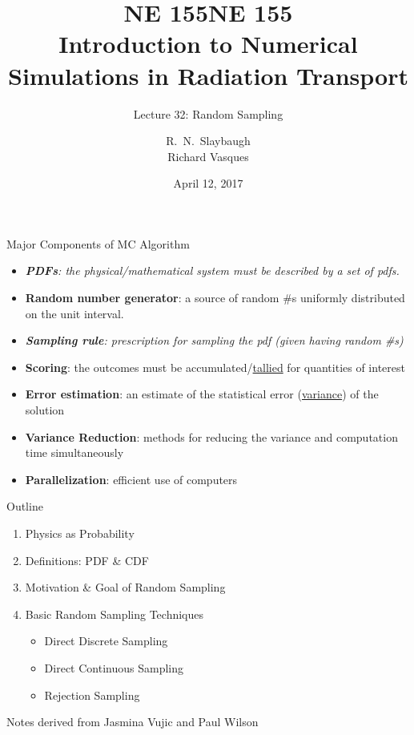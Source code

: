 \documentclass[xcolor=x11names,compress, handouts]{beamer}
\title{NE 155}
\author{R.\ N.\ Slaybaugh \\
Richard Vasques}
\date{April 12, 2017}
\renewcommand{\(}{\begin{columns}}
\renewcommand{\)}{\end{columns}}
\newcommand{\<}[1]{\begin{column}{#1}}
\renewcommand{\>}{\end{column}}
\begin{document}
\begin{frame}
\title{NE 155\\Introduction to Numerical Simulations in Radiation Transport}
\subtitle{Lecture 32: Random Sampling}
\titlepage
\end{frame}


\begin{frame}{Major Components of MC Algorithm}

\begin{itemize}
  \item \textit{\textbf{PDFs}: the physical/mathematical system must be described by a set of pdfs.}
  \item \textbf{Random number generator}: a source of random \#s uniformly distributed on the unit interval.
  \item \textit{\textbf{Sampling rule}: prescription for sampling the pdf (given having random \#s)}
  \item \textbf{Scoring}: the outcomes must be accumulated/\underline{tallied} for quantities of interest
  \item \textbf{Error estimation}: an estimate of the statistical error (\underline{variance}) of the solution
  \item \textbf{Variance Reduction}: methods for reducing the variance and computation time simultaneously
  \item \textbf{Parallelization}: efficient use of computers
\end{itemize}
\end{frame}


\begin{frame}{Outline}

    \begin{enumerate}
    \item Physics as Probability
    \item Definitions: PDF \& CDF
    \item Motivation \& Goal of Random Sampling
    \item Basic Random Sampling Techniques
      \begin{itemize}
        \item Direct Discrete Sampling
        \item Direct Continuous Sampling
        \item Rejection Sampling
      \end{itemize}
    \end{enumerate}

\vspace*{1em}
Notes derived from Jasmina Vujic and Paul Wilson
\end{frame}
\end{document}
